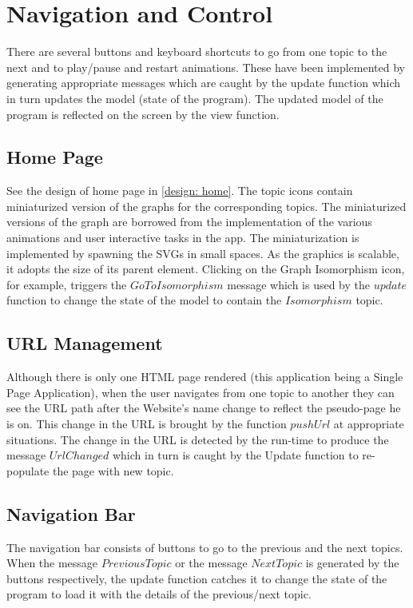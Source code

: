\section{Navigation and Control}
There are several buttons and keyboard shortcuts to go from one topic to the
next and to play/pause and restart animations. These have been implemented by
generating appropriate messages which are caught by the update function which
in turn updates the model (state of the program). The updated model of the
program is reflected on the screen by the view function.

\subsection{Home Page}
See the design of home page in \autoref{design: home}.  The topic icons contain
miniaturized version of the graphs for the corresponding topics. The
miniaturized versions of the graph are borrowed from the implementation of the
various animations and user interactive tasks in the app.  The miniaturization
is implemented by spawning the SVGs in small spaces. As the graphics is
scalable, it adopts the size of its parent element.  Clicking on the Graph
Isomorphism icon, for example, triggers the $GoToIsomorphism$ message which is
used by the $update$ function to change the state of the model to contain the
$Isomorphism$ topic.


\subsection{URL Management}
Although there is only one HTML page rendered (this application being a Single
Page Application), when the user navigates from one topic to another they can see
the URL path after the Website's name change to reflect the pseudo-page he is
on. This change in the URL is brought by the function $pushUrl$ at appropriate
situations.  The change in the URL is detected by the run-time to produce the
message $UrlChanged$ which in turn is caught by the Update function to
re-populate the page with new topic.

\subsection{Navigation Bar}
The navigation bar consists of buttons to go to the previous and the next
topics.  When the message $PreviousTopic$ or the message $NextTopic$ is
generated by the buttons respectively, the update function catches it to change
the state of the program to load it with the
details of the previous/next topic.

